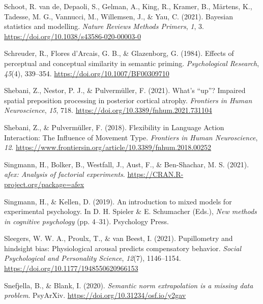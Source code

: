 \documentclass[
  12pt,
  man,floatsintext]{apa7}
\newlength{\cslhangindent}
\newlength{\cslentryspacingunit} %
\newenvironment{CSLReferences}[2] %
 {%
  \setlength{\parindent}{0pt}
  \ifodd #1
  \let\oldpar\par
  \def\par{\hangindent=\cslhangindent\oldpar}
  \fi
  \setlength{\parskip}{#2\cslentryspacingunit}
 }%
 {}
\begin{document}
\begin{CSLReferences}{1}{0}
\leavevmode{}%
Schoot, R. van de, Depaoli, S., Gelman, A., King, R., Kramer, B., Märtens, K., Tadesse, M. G., Vannucci, M., Willemsen, J., \& Yau, C. (2021). Bayesian statistics and modelling. \emph{Nature Reviews Methods Primers}, \emph{1}, 3. \url{https://doi.org/10.1038/s43586-020-00003-0}

\leavevmode{}%
Schreuder, R., Flores d'Arcais, G. B., \& Glazenborg, G. (1984). Effects of perceptual and conceptual similarity in semantic priming. \emph{Psychological Research}, \emph{45}(4), 339--354. \url{https://doi.org/10.1007/BF00309710}

\leavevmode{}%
Shebani, Z., Nestor, P. J., \& Pulvermüller, F. (2021). What's {``up''}? {Impaired} spatial preposition processing in posterior cortical atrophy. \emph{Frontiers in Human Neuroscience}, \emph{15}, 718. \url{https://doi.org/10.3389/fnhum.2021.731104}

\leavevmode{}%
Shebani, Z., \& Pulvermüller, F. (2018). Flexibility in {Language Action Interaction}: {The Influence} of {Movement Type}. \emph{Frontiers in Human Neuroscience}, \emph{12}. \url{https://www.frontiersin.org/article/10.3389/fnhum.2018.00252}

\leavevmode{}%
Singmann, H., Bolker, B., Westfall, J., Aust, F., \& Ben-Shachar, M. S. (2021). \emph{{afex}: Analysis of factorial experiments}. \url{https://CRAN.R-project.org/package=afex}

\leavevmode{}%
Singmann, H., \& Kellen, D. (2019). An introduction to mixed models for experimental psychology. In D. H. Spieler \& E. Schumacher (Eds.), \emph{New methods in cognitive psychology} (pp. 4--31). {Psychology Press}.

\leavevmode{}%
Sleegers, W. W. A., Proulx, T., \& van Beest, I. (2021). Pupillometry and hindsight bias: Physiological arousal predicts compensatory behavior. \emph{Social Psychological and Personality Science}, \emph{12}(7), 1146--1154. \url{https://doi.org/10.1177/1948550620966153}

\leavevmode{}%
Snefjella, B., \& Blank, I. (2020). \emph{Semantic norm extrapolation is a missing data problem}. {PsyArXiv}. \url{https://doi.org/10.31234/osf.io/y2gav}


\end{CSLReferences}
\end{document}
